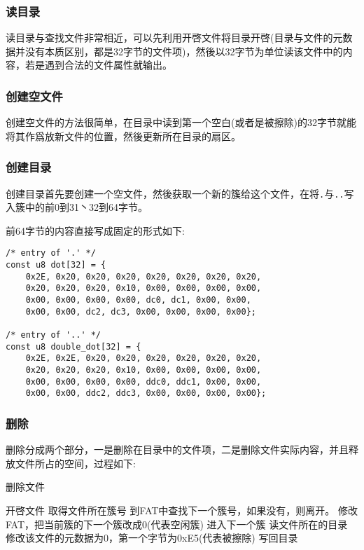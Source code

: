 \subsubsection{读目录}

读目录与查找文件非常相近，可以先利用开啓文件将目录开啓(目录与文件的元数据并没有本质区别，都是32字节的文件项)，然後以32字节为单位读该文件中的内容，若是遇到合法的文件属性就输出。



\subsubsection{创建空文件}

创建空文件的方法很简单，在目录中读到第一个空白(或者是被擦除)的32字节就能将其作爲放新文件的位置，然後更新所在目录的扇区。



\subsubsection{创建目录}

创建目录首先要创建一个空文件，然後获取一个新的簇给这个文件，在将\texttt{.}与\texttt{..}写入簇中的前0到31丶32到64字节。



前64字节的内容直接写成固定的形式如下: 

\begin{lstlisting}[caption=.与..]
/* entry of '.' */
const u8 dot[32] = {
    0x2E, 0x20, 0x20, 0x20, 0x20, 0x20, 0x20, 0x20,
    0x20, 0x20, 0x20, 0x10, 0x00, 0x00, 0x00, 0x00,
    0x00, 0x00, 0x00, 0x00, dc0, dc1, 0x00, 0x00,
    0x00, 0x00, dc2, dc3, 0x00, 0x00, 0x00, 0x00};

/* entry of '..' */
const u8 double_dot[32] = {
    0x2E, 0x2E, 0x20, 0x20, 0x20, 0x20, 0x20, 0x20,
    0x20, 0x20, 0x20, 0x10, 0x00, 0x00, 0x00, 0x00,
    0x00, 0x00, 0x00, 0x00, ddc0, ddc1, 0x00, 0x00,
    0x00, 0x00, ddc2, ddc3, 0x00, 0x00, 0x00, 0x00};
\end{lstlisting}


\subsubsection{删除}

删除分成两个部分，一是删除在目录中的文件项，二是删除文件实际内容，并且释放文件所占的空间，过程如下: 

\begin{algorithm}[H]
	\caption{删除文件}
	\begin{algorithmic}[1]
      \State 开啓文件
      \State 取得文件所在簇号
        \State 到FAT中查找下一个簇号，如果没有，则离开。
        \State 修改FAT，把当前簇的下一个簇改成0(代表空闲簇)
        \State 进入下一个簇
      \EndFor
      \State 读文件所在的目录
      \State 修改该文件的元数据为0，第一个字节为0xE5(代表被擦除)
      \State 写回目录
		\EndFunction
	\end{algorithmic}
\end{algorithm}


